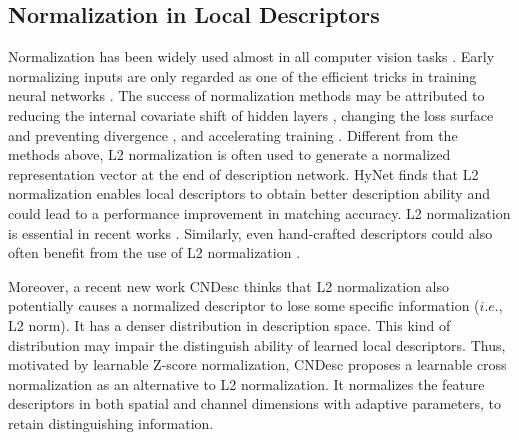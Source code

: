 \documentclass[journal]{IEEEtran}
\begin{document}
\subsection{Normalization in Local Descriptors}
Normalization has been widely used almost in all computer vision tasks \cite{BN,GN}. Early normalizing inputs are only regarded as one of the efficient tricks in training neural networks \cite{645754.668382}. The success of normalization methods may be attributed to reducing the internal covariate shift of hidden layers \cite{BN,LayerN}, changing the loss surface and preventing divergence \cite{3305381.3305417}, and accelerating training \cite{BN}. Different from the methods above, L2 normalization is often used to generate a normalized representation vector at the end of description network. HyNet \cite{HyNet} finds that L2 normalization enables local descriptors to obtain better description ability and could lead to a performance improvement in matching accuracy. L2 normalization is essential in recent works \cite{SuperPoint,disk}. Similarly, even hand-crafted descriptors could also often benefit from the use of L2 normalization \cite{HPatches}. 

Moreover, a recent new work CNDesc \cite{cndesc} thinks that L2 normalization also potentially causes a normalized descriptor to lose some specific information ($i.e.$, L2 norm). It has a denser distribution in description space. This kind of distribution may impair the distinguish ability of learned local descriptors. Thus, motivated by learnable Z-score normalization, CNDesc proposes a learnable cross normalization as an alternative to L2 normalization.
It normalizes the feature descriptors in both spatial and channel dimensions with adaptive parameters, to retain distinguishing information. 
\end{document}
